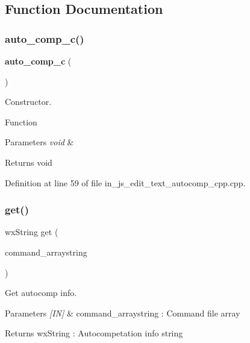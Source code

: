 \subsection{Function Documentation}
\mbox{\label{group___edit__text__autocompetation_gab0272736c03bc9cb847693c09d2b62a4}} 
\subsubsection{auto\_comp\_c()}
{\footnotesize\ttfamily \textbf{ auto\+\_\+comp\+\_\+c} (\begin{DoxyParamCaption}\item[{void}]{ }\end{DoxyParamCaption})}



Constructor. 

Function
\begin{DoxyParams}{Parameters}
{\em void} & \\
\hline
\end{DoxyParams}
\begin{DoxyReturn}{Returns}
void 
\end{DoxyReturn}


Definition at line 59 of file in\+\_\+js\+\_\+edit\+\_\+text\+\_\+autocomp\+\_\+cpp.\+cpp.

\mbox{\label{group___edit__text__autocompetation_ga75d2bc4ad7e176998bb9ae72a0c6a32f}} 
\subsubsection{get()}
{\footnotesize\ttfamily wx\+String get (\begin{DoxyParamCaption}\item[{wx\+Array\+String}]{command\+\_\+arraystring }\end{DoxyParamCaption})}



Get autocomp info. 


\begin{DoxyParams}{Parameters}
{\em \mbox{[}\+I\+N\mbox{]}} & command\+\_\+arraystring \+: Command file array \\
\hline
\end{DoxyParams}
\begin{DoxyReturn}{Returns}
wx\+String \+: Autocompetation info string 
\end{DoxyReturn}


